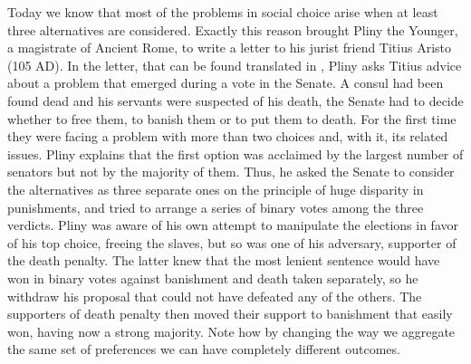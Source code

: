 Today we know that most of the problems in social choice arise when at least three alternatives are considered.
Exactly this reason brought Pliny the Younger, a magistrate of Ancient Rome, to write a letter to his jurist friend Titius Aristo (105 AD). In the letter, that can be found translated in \citet[Chapter 2]{McLeanUrken1995}, Pliny asks Titius advice about a problem that emerged during a vote in the Senate. 
A consul had been found dead and his servants were suspected of his death, the Senate had to decide whether to free them, to banish them or to put them to death. For the first time they were facing a problem with more than two choices and, with it, its related issues.
Pliny explains that the first option was acclaimed by the largest number of senators but not by the majority of them. Thus, he asked the Senate to consider the alternatives as three separate ones on the principle of huge disparity in punishments, and tried to arrange a series of binary votes among the three verdicts.
Pliny was aware of his own attempt to manipulate the elections in favor of his top choice, freeing the slaves, but so was one of his adversary, supporter of the death penalty.
The latter knew that the most lenient sentence would have won in binary votes against banishment and death taken separately, so he withdraw his proposal that could not have defeated any of the others.
The supporters of death penalty then moved their support to banishment that easily won, having now a strong majority. Note how by changing the way we aggregate the same set of preferences we can have completely different outcomes.

